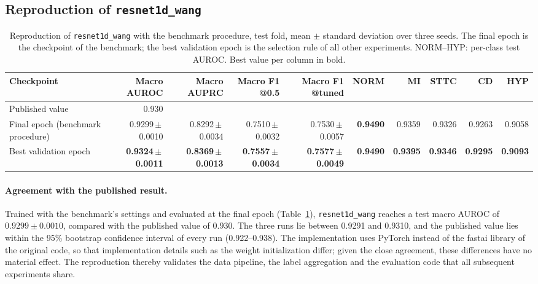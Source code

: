 \documentclass{article}
\newcommand{\wang}{\texttt{resnet1d\_wang}}
\begin{document}
\subsection{Reproduction of \texorpdfstring{\wang{}}{resnet1d\_wang}}

\begin{table}[htb]
  \caption{Reproduction of \wang{} with the benchmark procedure, test fold, mean $\pm$ standard deviation over three seeds. The final epoch is the checkpoint of the benchmark; the best validation epoch is the selection rule of all other experiments. NORM--HYP: per-class test AUROC. Best value per column in bold.}
  \label{tab:wang}
  \centering\footnotesize
  \begin{adjustbox}{max width=\linewidth}
  \begin{tabular}{lrrrrrrrrr}
    \toprule
    Checkpoint & Macro AUROC & Macro AUPRC & Macro F1 @0.5 & Macro F1 @tuned & NORM & MI & STTC & CD & HYP \\
    \midrule
    Published value \citep{strodthoff2021} & 0.930 &  &  &  &  &  &  & & \\
    Final epoch (benchmark procedure) & 0.9299\,$\pm$\,0.0010 & 0.8292\,$\pm$\,0.0034 & 0.7510\,$\pm$\,0.0032 & 0.7530\,$\pm$\,0.0057 & \textbf{0.9490} & 0.9359 & 0.9326 & 0.9263 & 0.9058 \\
    Best validation epoch & \textbf{0.9324\,$\pm$\,0.0011} & \textbf{0.8369\,$\pm$\,0.0013} & \textbf{0.7557\,$\pm$\,0.0034} & \textbf{0.7577\,$\pm$\,0.0049} & \textbf{0.9490} & \textbf{0.9395} & \textbf{0.9346} & \textbf{0.9295} & \textbf{0.9093} \\
    \bottomrule
  \end{tabular}
  \end{adjustbox}
\end{table}


\paragraph{Agreement with the published result.} Trained with the benchmark's settings and evaluated at the final epoch (Table~\ref{tab:wang}), \wang{} reaches a test macro AUROC of $0.9299\pm0.0010$, compared with the published value of $0.930$. The three runs lie between 0.9291 and 0.9310, and the published value lies within the 95\% bootstrap confidence interval of every run (0.922--0.938). The implementation uses PyTorch instead of the fastai library of the original code, so that implementation details such as the weight initialization differ; given the close agreement, these differences have no material effect. The reproduction thereby validates the data pipeline, the label aggregation and the evaluation code that all subsequent experiments share.
\end{document}
